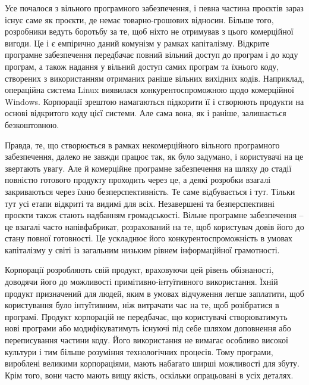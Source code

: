 \documentclass[12pt,a4paper,openany]{book}
\begin{document}
Усе почалося з вільного програмного забезпечення, і певна частина проєктів зараз існує саме як проєкти, де немає товарно-грошових відносин. Більше того, розробники ведуть боротьбу за те, щоб ніхто не отримував з цього комерційної вигоди. Це і є емпірично даний комунізм у рамках капіталізму. Відкрите програмне забезпечення передбачає повний вільний доступ до програм і до коду програм, а також надання у вільний доступ самих програм та їхнього коду, створених з використанням отриманих раніше вільних вихідних кодів. Наприклад, операційна система Linux виявилася конкурентоспроможною щодо комерційної Windows. Корпорації зрештою намагаються підкорити її і створюють продукти на основі відкритого коду цієї системи. Але сама вона, як і раніше, залишається безкоштовною.

Правда, те, що створюється в рамках некомерційного вільного програмного забезпечення, далеко не завжди працює так, як було задумано, і користувачі на це звертають увагу. Але й комерційне програмне забезпечення на шляху до стадії повністю готового продукту проходить через це, а деякі розробки взагалі закриваються через їхню безперспективність. Те саме відбувається і тут. Тільки тут усі етапи відкриті та видимі для всіх. Незавершені та безперспективні проєкти також стають надбанням громадськості. Вільне програмне забезпечення – це взагалі часто напівфабрикат, розрахований на те, щоб користувач довів його до стану повної готовності. Це ускладнює його конкурентоспроможність в умовах капіталізму у світі із загальним низьким рівнем інформаційної грамотності.

Корпорації розробляють свій продукт, враховуючи цей рівень обізнаності, доводячи його до можливості примітивно-інтуїтивного використання. Їхній продукт призначений для людей, яким в умовах відчуження легше заплатити, щоб користування було інтуїтивним, ніж витрачати час на те, щоб розібратися в програмі. Продукт корпорацій не передбачає, що користувачі створюватимуть нові програми або модифікуватимуть існуючі під себе шляхом доповнення або переписування частини коду. Його використання не вимагає особливо високої культури і тим більше розуміння технологічних процесів. Тому програми, вироблені великими корпораціями, мають набагато ширші можливості для збуту. Крім того, вони часто мають вищу якість, оскільки опрацьовані в усіх деталях.
\end{document}

